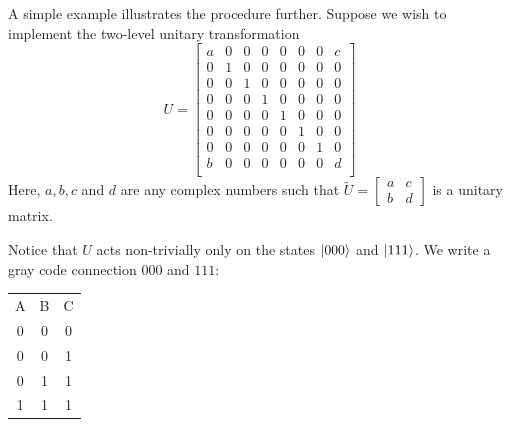 A simple example illustrates the procedure further. Suppose we wish to implement the two-level unitary transformation
\[
U=\begin{bmatrix} 
a & 0 & 0 & 0 & 0 & 0 & 0 & c \\
0 & 1 & 0 & 0 & 0 & 0 & 0 & 0 \\
0 & 0 & 1 & 0 & 0 & 0 & 0 & 0 \\
0 & 0 & 0 & 1 & 0 & 0 & 0 & 0 \\
0 & 0 & 0 & 0 & 1 & 0 & 0 & 0 \\
0 & 0 & 0 & 0 & 0 & 1 & 0 & 0 \\
0 & 0 & 0 & 0 & 0 & 0 & 1 & 0 \\
b & 0 & 0 & 0 & 0 & 0 & 0 & d \\
\end{bmatrix}
\]
Here, $a,b,c$ and $d$ are any complex numbers such that $\tilde{U}=\begin{bmatrix}a & c \\ b & d \end{bmatrix}$ is a unitary matrix.

Notice that $U$ acts non-trivially only on the states $\ket{000}$ and $\ket{111}$. We write a gray code connection $000$ and $111$:

\begin{table}[ht]
    \centering
    \begin{tabular}{ccc}
        A & B & C\\
        0 & 0 & 0\\
        0 & 0 & 1\\
        0 & 1 & 1\\
        1 & 1 & 1\\
    \end{tabular}
\end{table}

